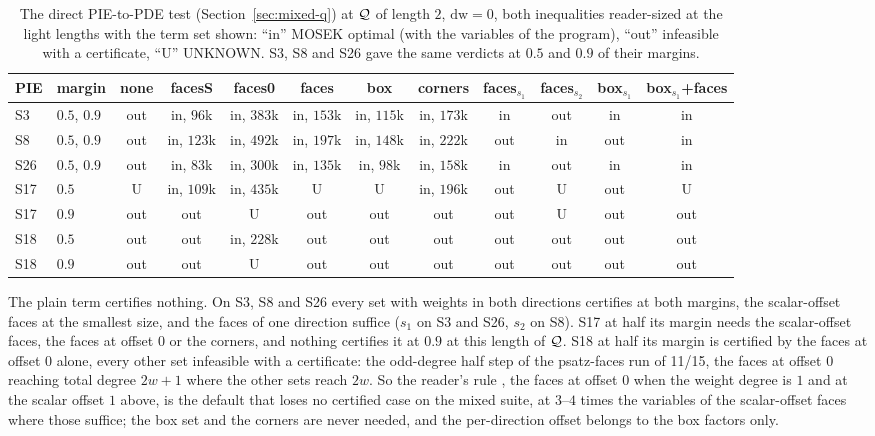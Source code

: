 \begin{table}[h]\centering\footnotesize
\setlength{\tabcolsep}{3pt}
\begin{tabular}{llcccccccccc}
\toprule
PIE & margin & none & facesS & faces0 & faces & box & corners & faces$_{s_1}$ & faces$_{s_2}$ & box$_{s_1}$ & box$_{s_1}$+faces \\
\midrule
S3 & $0.5$, $0.9$ & out & in, $96$k & in, $383$k & in, $153$k & in, $115$k & in, $173$k & in & out & in & in \\
S8 & $0.5$, $0.9$ & out & in, $123$k & in, $492$k & in, $197$k & in, $148$k & in, $222$k & out & in & out & in \\
S26 & $0.5$, $0.9$ & out & in, $83$k & in, $300$k & in, $135$k & in, $98$k & in, $158$k & in & out & in & in \\
S17 & $0.5$ & U & in, $109$k & in, $435$k & U & U & in, $196$k & out & U & out & U \\
S17 & $0.9$ & out & out & U & out & out & out & out & U & out & out \\
S18 & $0.5$ & out & out & in, $228$k & out & out & out & out & out & out & out \\
S18 & $0.9$ & out & out & U & out & out & out & out & out & out & out \\
\bottomrule
\end{tabular}
\caption{The direct PIE-to-PDE test (Section~\ref{sec:mixed-q}) at $\mathcal{Q}$ of length $2$, $\mathrm{dw}=0$, both inequalities reader-sized at the light lengths with the term set shown: ``in'' MOSEK optimal (with the variables of the program), ``out'' infeasible with a certificate, ``U'' UNKNOWN. S3, S8 and S26 gave the same verdicts at $0.5$ and $0.9$ of their margins.}\label{tab:t2}
\end{table}

The plain term certifies nothing. On S3, S8 and S26 every set with weights in both directions certifies at both margins, the scalar-offset faces at the smallest size, and the faces of one direction suffice ($s_1$ on S3 and S26, $s_2$ on S8). S17 at half its margin needs the scalar-offset faces, the faces at offset $0$ or the corners, and nothing certifies it at $0.9$ at this length of $\mathcal{Q}$. S18 at half its margin is certified by the faces at offset $0$ alone, every other set infeasible with a certificate: the odd-degree half step of the psatz-faces run of 11/15, the faces at offset $0$ reaching total degree $2w+1$ where the other sets reach $2w$. So the reader's rule , the faces at offset $0$ when the weight degree is $1$ and at the scalar offset $1$ above, is the default that loses no certified case on the mixed suite, at $3$--$4$ times the variables of the scalar-offset faces where those suffice; the box set and the corners are never needed, and the per-direction offset belongs to the box factors only.

